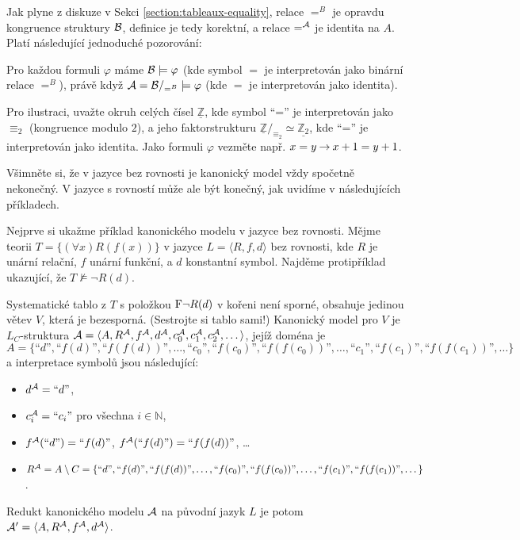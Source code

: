 Jak plyne z diskuze v Sekci \ref{section:tableaux-equality}, relace $=^B$ je opravdu kongruence struktury $\mathcal{B}$, definice je tedy korektní, a relace $=^{\mathcal{A}}$ je identita na $A$. Platí následující jednoduché pozorování:


\begin{observation}\label{canonical-with-equality-satisfies-the-same}
    Pro každou formuli $\varphi$ máme $\mathcal{B}\models\varphi$ (kde symbol $=$ je interpretován jako binární relace $=^B$), právě když $\mathcal{A}=\mathcal{B}/_{=^B}\models\varphi$ (kde $=$ je interpretován jako identita).    
\end{observation}

\begin{example}
    Pro ilustraci, uvažte okruh celých čísel $\underline{\mathbb Z}$, kde symbol ``='' je interpretován jako $\equiv_2$ (kongruence modulo $2$), a jeho faktorstrukturu $\underline{\mathbb Z}/_{\equiv_2}\simeq \underline{\mathbb Z_2}$, kde ``='' je interpretován jako identita. Jako formuli $\varphi$ vezměte např. $x=y\mathbin{\rightarrow} x+1=y+1$.
\end{example}

Všimněte si, že v jazyce bez rovnosti je kanonický model vždy spočetně nekonečný. V jazyce s rovností může ale být konečný, jak uvidíme v následujících příkladech.

\begin{example}
    Nejprve si ukažme příklad kanonického modelu v jazyce bez rovnosti. Mějme teorii $T=\{(\forall x)R(f(x))\}$ v jazyce $L=\langle R,f,d \rangle$ bez rovnosti, kde $R$ je unární relační, $f$ unární funkční, a $d$ konstantní symbol. Najděme protipříklad ukazující, že $T\not\models\neg R(d)$. 
    
    Systematické tablo z $T$ s položkou $\mathrm{F}\neg R(d)$ v kořeni není sporné, obsahuje jedinou větev $V$, která je bezesporná. (Sestrojte si tablo sami!) Kanonický model pro $V$ je $L_C$-struktura $\mathcal{A}=\langle A,R^{\mathcal{A}},f^{\mathcal{A}},d^{\mathcal{A}},c_0^{\mathcal{A}},c_1^{\mathcal{A}},c_2^{\mathcal{A}},\dots\rangle$, jejíž doména je
    $$
    A=\{\text{``$d$''},\text{``$f(d)$''},\text{``$f(f(d))$''},\dots,\text{``$c_0$''},\text{``$f(c_0)$''},\text{``$f(f(c_0))$''},\dots,\text{``$c_1$''},\text{``$f(c_1)$''},\text{``$f(f(c_1))$''},\dots\}
    $$
    a interpretace symbolů jsou následující:
    \begin{itemize}
        \item $d^{\mathcal{A}}=\text{``$d$''}$,
        \item $c^{\mathcal{A}}_i=\text{``$c_i$''}$ pro všechna $i\in \mathbb N$,
        \item $f^{\mathcal{A}}(\text{``$d$''})=\text{``$f(d)$''}$, $f^{\mathcal{A}}(\text{``$f(d)$''})=\text{``$f(f(d))$''}$, \dots
        \item $R^{\mathcal{A}}=A\setminus C=\{\text{``$d$''},\text{``$f(d)$''},\text{``$f(f(d))$''},\dots,\text{``$f(c_0)$''},\text{``$f(f(c_0))$''},\dots,\text{``$f(c_1)$''},\text{``$f(f(c_1))$''},\dots\}$.
    \end{itemize}
    Redukt kanonického modelu $\mathcal{A}$ na původní jazyk $L$ je potom $\mathcal{A}'=\langle A, R^{\mathcal{A}}, f^{\mathcal{A}}, d^{\mathcal{A}}\rangle$.
\end{example}

